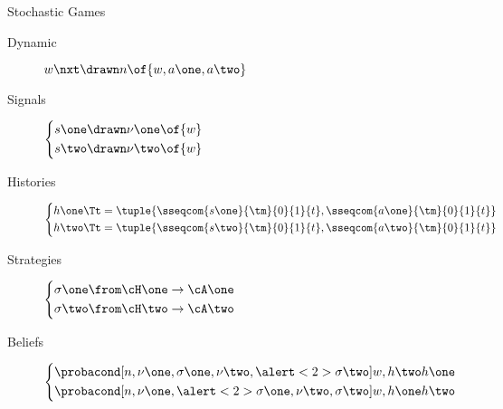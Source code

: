 \begin{frame}{Stochastic Games}
  \begin{description}
    \item[Dynamic] \(w\nxt \drawn n \of{w, a\one, a\two}\)
    \item[Signals] \(
                   \left\{
                   \begin{aligned}
                     s\one &\drawn \nu\one \of{w} \\
                     s\two &\drawn \nu\two \of{w}
                   \end{aligned}
                   \right.
                   \)

    \item[Histories] \(
                     \left\{
                       \begin{aligned}
                         h\one\Tt &= \tuple{\sseqcom{s\one}{\tm}{0}{1}{t}, \sseqcom{a\one}{\tm}{0}{1}{t}}\\
                         h\two\Tt &= \tuple{\sseqcom{s\two}{\tm}{0}{1}{t}, \sseqcom{a\two}{\tm}{0}{1}{t}}
                       \end{aligned}
                     \right.
                     \)

    \item[Strategies] \(
                      \left\{
                        \begin{aligned}
                          \sigma\one \from & \cH\one \to \cA\one\\
                          \sigma\two \from & \cH\two \to \cA\two
                        \end{aligned}
                      \right.
                      \)

    \item[Beliefs] \(
                   \left\{
                     \begin{aligned}
                       &\probacond[n, \nu\one, \sigma\one, \nu\two, \alert<2>{\sigma\two}]{w, h\two}{h\one} \\
                       &\probacond[n, \nu\one, \alert<2>{\sigma\one}, \nu\two, \sigma\two]{w, h\one}{h\two}
                     \end{aligned}
                   \right.
                   \)
  \end{description}
\end{frame}
